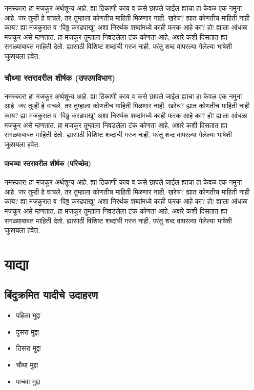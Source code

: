 नमस्कार! हा मजकूर अर्थशून्य आहे. ह्या ठिकाणी काय व कसे छापले जाईल ह्याचा हा केवळ एक नमुना
आहे. जर तुम्ही हे वाचले, तर तुम्हाला कोणतीच माहिती मिळणार नाही. खरेच? ह्यात कोणतीच माहिती
नाही काय? ह्या मजकुरात व `पिढ्ढ करढपाखू' अशा निरर्थक शब्दांमध्ये काही फरक आहे का? हो!
ह्याला आंधळा मजकूर असे म्हणतात. हा मजकूर तुम्हाला निवडलेला टंक कोणता आहे, अक्षरे कशी दिसतात
ह्या सगळ्याबाबत माहिती देतो. ह्यासाठी विशिष्ट शब्दांची गरज नाही, परंतु शब्द वापरल्या गेलेल्या
भाषेशी जुळायला हवेत.

\subsubsection{चौथ्या स्तरावरील शीर्षक (उपउपविभाग)}
नमस्कार! हा मजकूर अर्थशून्य आहे. ह्या ठिकाणी काय व कसे छापले जाईल ह्याचा हा केवळ एक नमुना
आहे. जर तुम्ही हे वाचले, तर तुम्हाला कोणतीच माहिती मिळणार नाही. खरेच? ह्यात कोणतीच माहिती
नाही काय? ह्या मजकुरात व `पिढ्ढ करढपाखू' अशा निरर्थक शब्दांमध्ये काही फरक आहे का? हो!
ह्याला आंधळा मजकूर असे म्हणतात. हा मजकूर तुम्हाला निवडलेला टंक कोणता आहे, अक्षरे कशी दिसतात
ह्या सगळ्याबाबत माहिती देतो. ह्यासाठी विशिष्ट शब्दांची गरज नाही, परंतु शब्द वापरल्या गेलेल्या
भाषेशी जुळायला हवेत.

\paragraph{पाचव्या स्तरावरील शीर्षक (परिच्छेद)}
नमस्कार! हा मजकूर अर्थशून्य आहे. ह्या ठिकाणी काय व कसे छापले जाईल ह्याचा हा केवळ एक नमुना
आहे. जर तुम्ही हे वाचले, तर तुम्हाला कोणतीच माहिती मिळणार नाही. खरेच? ह्यात कोणतीच माहिती
नाही काय? ह्या मजकुरात व `पिढ्ढ करढपाखू' अशा निरर्थक शब्दांमध्ये काही फरक आहे का? हो!
ह्याला आंधळा मजकूर असे म्हणतात. हा मजकूर तुम्हाला निवडलेला टंक कोणता आहे, अक्षरे कशी दिसतात
ह्या सगळ्याबाबत माहिती देतो. ह्यासाठी विशिष्ट शब्दांची गरज नाही, परंतु शब्द वापरल्या गेलेल्या
भाषेशी जुळायला हवेत.

\section{याद्या}

\subsection{बिंदुक्रमित यादीचे उदाहरण}

\begin{itemize}
\item पहिला मुद्दा
\item दुसरा मुद्दा
\item तिसरा मुद्दा
\item चौथा मुद्दा
\item पाचवा मुद्दा
\end{itemize}

